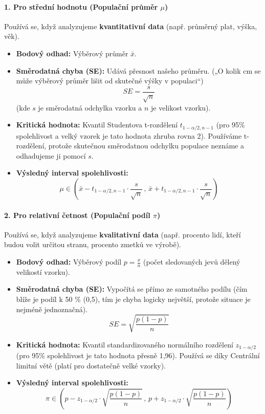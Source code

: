 \paragraph*{1. Pro střední hodnotu (Populační průměr $\mu$)}
Používá se, když analyzujeme \textbf{kvantitativní data} (např. průměrný plat, výška, věk).

\begin{itemize}
    \item \textbf{Bodový odhad:} Výběrový průměr $\bar{x}$.
    \item \textbf{Směrodatná chyba (SE):} Udává přesnost našeho průměru. („O kolik cm se může výběrový průměr lišit od skutečné výšky v populaci“)
    \[ SE = \frac{s}{\sqrt{n}} \]
    (kde $s$ je směrodatná odchylka vzorku a $n$ je velikost vzorku).
    \item \textbf{Kritická hodnota:} Kvantil Studentova t-rozdělení $t_{1-\alpha/2,n-1}$ (pro 95\% spolehlivost a velký vzorek je tato hodnota zhruba rovna 2). Používáme t-rozdělení, protože skutečnou směrodatnou odchylku populace neznáme a odhadujeme ji pomocí $s$.
    \item \textbf{Výsledný interval spolehlivosti:}
    \[ \mu \in \left( \bar{x} - t_{1-\alpha/2,n-1} \cdot \frac{s}{\sqrt{n}} \, , \, \bar{x} + t_{1-\alpha/2,n-1} \cdot \frac{s}{\sqrt{n}} \right) \]
\end{itemize}

\paragraph*{2. Pro relativní četnost (Populační podíl $\pi$)}
Používá se, když analyzujeme \textbf{kvalitativní data} (např. procento lidí, kteří budou volit určitou stranu, procento zmetků ve výrobě).

\begin{itemize}
    \item \textbf{Bodový odhad:} Výběrový podíl $p = \frac{x}{n}$ (počet sledovaných jevů dělený velikostí vzorku).
    \item \textbf{Směrodatná chyba (SE):} Vypočítá se přímo ze samotného podílu (čím blíže je podíl k 50 \% (0,5), tím je chyba logicky největší, protože situace je nejméně jednoznačná).
    \[ SE = \sqrt{\frac{p(1-p)}{n}} \]
    \item \textbf{Kritická hodnota:} Kvantil standardizovaného normálního rozdělení $z_{1-\alpha/2}$ (pro 95\% spolehlivost je tato hodnota přesně 1,96). Používá se díky Centrální limitní větě (platí pro dostatečně velké vzorky).
    \item \textbf{Výsledný interval spolehlivosti:}
    \[ \pi \in \left( p - z_{1-\alpha/2} \cdot \sqrt{\frac{p(1-p)}{n}} \, , \, p + z_{1-\alpha/2} \cdot \sqrt{\frac{p(1-p)}{n}} \right) \]
\end{itemize}

